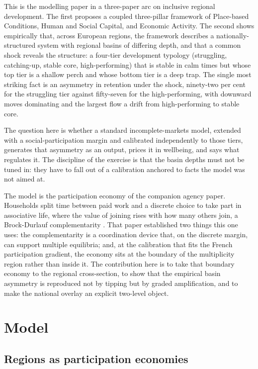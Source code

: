 \documentclass[11pt]{article}
\begin{document}
This is the modelling paper in a three-paper arc on inclusive regional
development. The first proposes a coupled three-pillar framework of
Place-based Conditions, Human and Social Capital, and Economic Activity.
The second shows empirically that, across European regions, the framework
describes a nationally-structured system with regional basins of differing
depth, and that a common shock reveals the structure: a four-tier
development typology (struggling, catching-up, stable core,
high-performing) that is stable in calm times but whose top tier is a
shallow perch and whose bottom tier is a deep trap. The single most
striking fact is an asymmetry in retention under the shock, ninety-two per
cent for the struggling tier against fifty-seven for the high-performing,
with downward moves dominating and the largest flow a drift from
high-performing to stable core.

The question here is whether a standard incomplete-markets model, extended
with a social-participation margin and calibrated independently to those
tiers, generates that asymmetry as an output, prices it in wellbeing, and
says what regulates it. The discipline of the exercise is that the basin
depths must not be tuned in: they have to fall out of a calibration
anchored to facts the model was not aimed at.

The model is the participation economy of the companion agency paper.
Households split time between paid work and a discrete choice to take part
in associative life, where the value of joining rises with how many others
join, a Brock-Durlauf complementarity \citep{brock2001}. That paper
established two things this one uses: the complementarity is a coordination
device that, on the discrete margin, can support multiple equilibria; and,
at the calibration that fits the French participation gradient, the economy
sits at the boundary of the multiplicity region rather than inside it. The
contribution here is to take that boundary economy to the regional
cross-section, to show that the empirical basin asymmetry is reproduced not
by tipping but by graded amplification, and to make the national overlay an
explicit two-level object.

\section{Model}

\subsection{Regions as participation economies}
\end{document}

